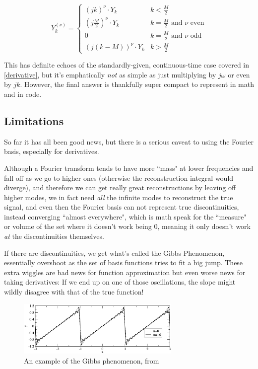 \documentclass[10pt]{article}
\begin{document}
\begin{equation}\label{Y_nu}
Y^{(\nu)}_k = \begin{cases} (j k)^\nu \cdot Y_k & k < \frac{M}{2} \\ (j \frac{M}{2})^\nu \cdot Y_k & k = \frac{M}{2} \text{ and } \nu \text{ even} \\ 0 & k = \frac{M}{2} \text{ and } \nu \text{ odd} \\ (j(k - M))^\nu \cdot Y_k & k > \frac{M}{2} \end{cases}
\end{equation}

This has definite echoes of the standardly-given, continuous-time case covered in \autoref{derivative}, but it's emphatically \textit{not} as simple as just multiplying by $j\omega$ or even by $j k$. However, the final answer is thankfully super compact to represent in math and in code.

\subsection{Limitations}

So far it has all been good news, but there is a serious caveat to using the Fourier basis, especially for derivatives.

Although a Fourier transform tends to have more ``mass" at lower frequencies and fall off as we go to higher ones (otherwise the reconstruction integral would diverge), and therefore we can get really great reconstructions by leaving off higher modes\cite{kutz}, we in fact need \textit{all} the infinite modes to reconstruct the true signal\cite{oppenheim}, and even then the Fourier basis can not represent true discontinuities, instead converging ``almost everywhere", which is math speak for the ``measure" or volume of the set where it doesn't work being 0, meaning it only doesn't work \textit{at} the discontinuities themselves.\cite{oppenheim}

If there are discontinuities, we get what's called the Gibbs Phenomenon\cite{oppenheim}, essentially overshoot as the set of basis functions tries to fit a big jump. These extra wiggles are bad news for function approximation but even worse news for taking derivatives: If we end up on one of those oscillations, the slope might wildly disagree with that of the true function!

\begin{figure}[h!]
	\centering
	\includegraphics[width=0.7\textwidth]{gibbs.png}
	\caption*{An example of the Gibbs phenomenon, from \cite{kutz}}
\end{figure}
\end{document}
